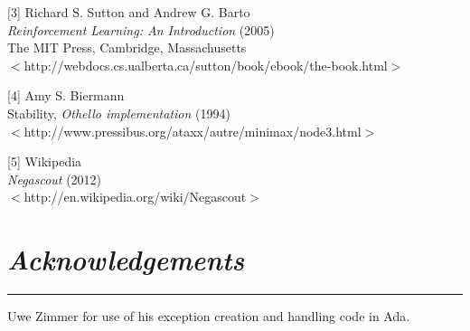 \documentclass[10pt]{report}
\begin{document}
[3] Richard S. Sutton and Andrew G. Barto\\
\emph{Reinforcement Learning: An Introduction} (2005)\\
The MIT Press, Cambridge, Massachusetts\\
$<$http://webdocs.cs.ualberta.ca/\texttildelow sutton/book/ebook/the-book.html$>$

[4]
Amy S. Biermann\\
Stability, \emph{Othello implementation} (1994)\\
$<$http://www.pressibus.org/ataxx/autre/minimax/node3.html$>$

[5]
Wikipedia\\
\emph{Negascout} (2012)\\
$<$http://en.wikipedia.org/wiki/Negascout$>$

\section*{\emph{\textmd{Acknowledgements}}}
\hrule
\vspace{0.4cm}

Uwe Zimmer for use of his exception creation and handling code in Ada.
\end{document}
